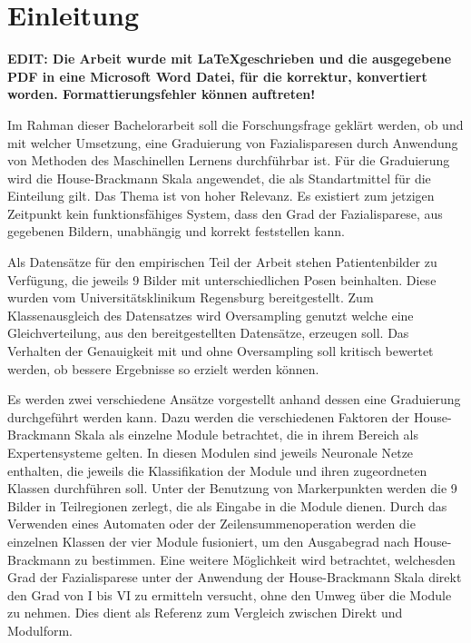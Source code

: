 
\chapter{Einleitung}
\label{einleitung}

\textbf{EDIT: Die Arbeit wurde mit \LaTeX geschrieben und die ausgegebene PDF in eine Microsoft Word Datei, für die korrektur, konvertiert worden. Formattierungsfehler können auftreten!}
\vspace{1cm}

Im Rahman dieser Bachelorarbeit soll die Forschungsfrage geklärt werden, ob und mit welcher Umsetzung, eine Graduierung von Fazialisparesen durch Anwendung von Methoden des Maschinellen Lernens durchführbar ist. Für die Graduierung wird die House-Brackmann Skala angewendet, die als Standartmittel für die Einteilung gilt. Das Thema ist von hoher Relevanz. Es existiert zum jetzigen Zeitpunkt kein funktionsfähiges System, dass den Grad der Fazialisparese, aus gegebenen Bildern, unabhängig und korrekt feststellen kann.

Als Datensätze für den empirischen Teil der Arbeit stehen Patientenbilder zu Verfügung, die jeweils 9 Bilder mit unterschiedlichen Posen beinhalten. Diese wurden vom Universitätsklinikum Regensburg bereitgestellt. Zum Klassenausgleich des Datensatzes wird Oversampling genutzt welche eine Gleichverteilung, aus den bereitgestellten Datensätze, erzeugen soll. Das Verhalten der Genauigkeit mit und ohne Oversampling soll kritisch bewertet werden, ob bessere Ergebnisse so erzielt werden können.

Es werden zwei verschiedene Ansätze vorgestellt anhand dessen eine Graduierung durchgeführt werden kann. Dazu werden die verschiedenen Faktoren der House-Brackmann Skala als einzelne Module betrachtet, die in ihrem Bereich als Expertensysteme gelten. In diesen Modulen sind jeweils Neuronale Netze enthalten, die jeweils die Klassifikation der Module und ihren zugeordneten Klassen durchführen soll. Unter der Benutzung von Markerpunkten werden die 9 Bilder in Teilregionen zerlegt, die als Eingabe in die Module dienen. Durch das Verwenden eines Automaten oder der Zeilensummenoperation werden die einzelnen Klassen der vier Module fusioniert, um den Ausgabegrad nach House-Brackmann zu bestimmen. Eine weitere Möglichkeit wird betrachtet, welchesden Grad der Fazialisparese unter der Anwendung der House-Brackmann Skala direkt den Grad von I bis VI zu ermitteln versucht, ohne den Umweg über die Module zu nehmen. Dies dient als Referenz zum Vergleich zwischen Direkt und Modulform.

